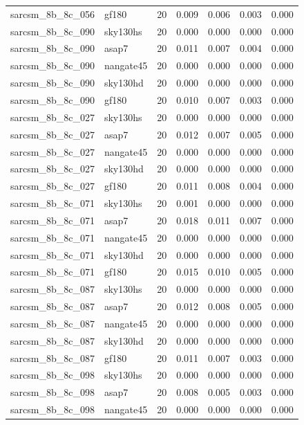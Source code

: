 \begin{tabular}{llrrrrr}
sarcsm\_8b\_8c\_056 & gf180 & 20 & 0.009 & 0.006 & 0.003 & 0.000 \\
sarcsm\_8b\_8c\_090 & sky130hs & 20 & 0.000 & 0.000 & 0.000 & 0.000 \\
sarcsm\_8b\_8c\_090 & asap7 & 20 & 0.011 & 0.007 & 0.004 & 0.000 \\
sarcsm\_8b\_8c\_090 & nangate45 & 20 & 0.000 & 0.000 & 0.000 & 0.000 \\
sarcsm\_8b\_8c\_090 & sky130hd & 20 & 0.000 & 0.000 & 0.000 & 0.000 \\
sarcsm\_8b\_8c\_090 & gf180 & 20 & 0.010 & 0.007 & 0.003 & 0.000 \\
sarcsm\_8b\_8c\_027 & sky130hs & 20 & 0.000 & 0.000 & 0.000 & 0.000 \\
sarcsm\_8b\_8c\_027 & asap7 & 20 & 0.012 & 0.007 & 0.005 & 0.000 \\
sarcsm\_8b\_8c\_027 & nangate45 & 20 & 0.000 & 0.000 & 0.000 & 0.000 \\
sarcsm\_8b\_8c\_027 & sky130hd & 20 & 0.000 & 0.000 & 0.000 & 0.000 \\
sarcsm\_8b\_8c\_027 & gf180 & 20 & 0.011 & 0.008 & 0.004 & 0.000 \\
sarcsm\_8b\_8c\_071 & sky130hs & 20 & 0.001 & 0.000 & 0.000 & 0.000 \\
sarcsm\_8b\_8c\_071 & asap7 & 20 & 0.018 & 0.011 & 0.007 & 0.000 \\
sarcsm\_8b\_8c\_071 & nangate45 & 20 & 0.000 & 0.000 & 0.000 & 0.000 \\
sarcsm\_8b\_8c\_071 & sky130hd & 20 & 0.000 & 0.000 & 0.000 & 0.000 \\
sarcsm\_8b\_8c\_071 & gf180 & 20 & 0.015 & 0.010 & 0.005 & 0.000 \\
sarcsm\_8b\_8c\_087 & sky130hs & 20 & 0.000 & 0.000 & 0.000 & 0.000 \\
sarcsm\_8b\_8c\_087 & asap7 & 20 & 0.012 & 0.008 & 0.005 & 0.000 \\
sarcsm\_8b\_8c\_087 & nangate45 & 20 & 0.000 & 0.000 & 0.000 & 0.000 \\
sarcsm\_8b\_8c\_087 & sky130hd & 20 & 0.000 & 0.000 & 0.000 & 0.000 \\
sarcsm\_8b\_8c\_087 & gf180 & 20 & 0.011 & 0.007 & 0.003 & 0.000 \\
sarcsm\_8b\_8c\_098 & sky130hs & 20 & 0.000 & 0.000 & 0.000 & 0.000 \\
sarcsm\_8b\_8c\_098 & asap7 & 20 & 0.008 & 0.005 & 0.003 & 0.000 \\
sarcsm\_8b\_8c\_098 & nangate45 & 20 & 0.000 & 0.000 & 0.000 & 0.000 \\

\end{tabular}
